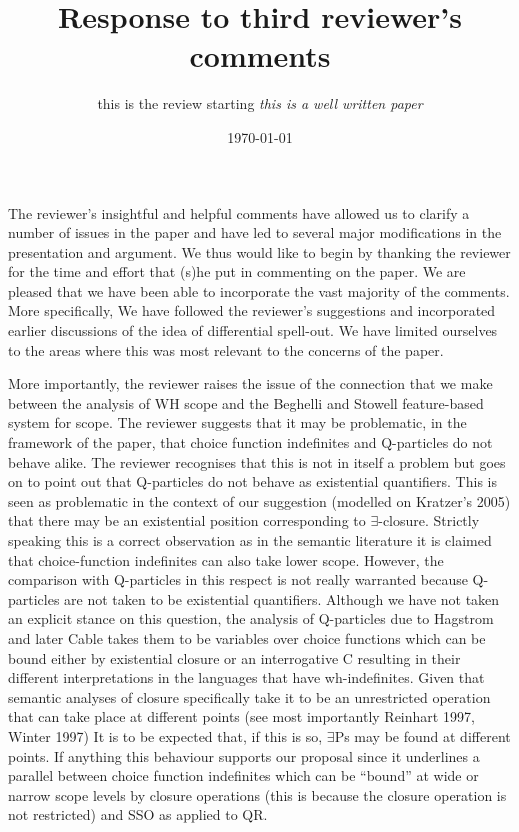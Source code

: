 \documentclass[11pt]{article}
\begin{document}
\title{Response to third reviewer's comments}
\author{this is the review starting \textit{this is a well written paper}}
\date{\today}

\maketitle


The reviewer's insightful and helpful comments have allowed us to clarify a number of issues in the paper and have led to several major modifications in the presentation and argument. We thus would like to begin by thanking the reviewer for the time and effort that (s)he put in commenting on the paper. We are pleased that we have been able to incorporate the vast majority of the comments.  More specifically, We have followed the reviewer's suggestions and incorporated earlier discussions of the idea of differential spell-out.  We have limited ourselves to the areas where this was most relevant to the concerns of the paper.

More importantly, the reviewer raises the issue of the connection that we make between the analysis of WH scope and the Beghelli and Stowell feature-based system for scope.  The reviewer suggests that it may be problematic, in the framework of the paper, that choice function  indefinites and Q-particles do not behave alike.  The reviewer recognises that this is not in itself a problem but goes on to point out that  Q-particles do not behave as existential quantifiers.  This is seen as problematic in the context of our suggestion (modelled on Kratzer's 2005) that there may be an existential position corresponding to $\exists$-closure.    Strictly speaking this is a correct observation as in the semantic literature it is claimed that choice-function indefinites can also take lower scope.  However, the comparison with Q-particles in this respect is not really warranted because Q-particles are not taken to be existential quantifiers.  Although we have not taken an explicit stance on this question, the analysis of Q-particles due to Hagstrom and later Cable takes them to be variables over choice functions which can be bound either by existential closure or an interrogative C resulting in their different interpretations in the languages that have wh-indefinites. Given that semantic analyses of closure specifically take it to be an unrestricted operation that can take place at different points (see most importantly Reinhart 1997, Winter 1997)  It is to be expected that, if this is so, $\exists$Ps may be found at different points.   If anything this behaviour supports our proposal since it underlines a parallel between choice function indefinites which can be ``bound'' at wide or narrow scope levels by closure operations (this is because the closure operation is not restricted) and SSO as applied to QR.
\end{document}
